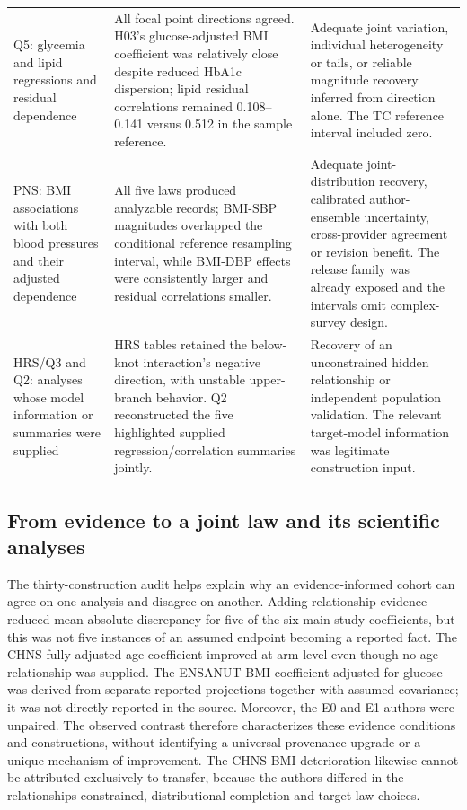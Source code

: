 \documentclass[11pt,letterpaper]{article}
\begin{document}
\begin{xltabular}{\linewidth}{@{}>{\raggedright\arraybackslash}X>{\raggedright\arraybackslash}X>{\raggedright\arraybackslash}X@{}}
Q5: glycemia and lipid regressions and residual dependence & All focal point directions agreed. H03's glucose-adjusted BMI coefficient was relatively close despite reduced HbA1c dispersion; lipid residual correlations remained 0.108–\allowbreak{}0.141 versus 0.512 in the sample reference. & Adequate joint variation, individual heterogeneity or tails, or reliable magnitude recovery inferred from direction alone. The TC reference interval included zero. \\

PNS: BMI associations with both blood pressures and their adjusted dependence & All five laws produced analyzable records; BMI-SBP magnitudes overlapped the conditional reference resampling interval, while BMI-DBP effects were consistently larger and residual correlations smaller. & Adequate joint-distribution recovery, calibrated author-ensemble uncertainty, cross-provider agreement or revision benefit. The release family was already exposed and the intervals omit complex-survey design. \\

HRS/\allowbreak{}Q3 and Q2: analyses whose model information or summaries were supplied & HRS tables retained the below-knot interaction's negative direction, with unstable upper-branch behavior. Q2 reconstructed the five highlighted supplied regression/\allowbreak{}correlation summaries jointly. & Recovery of an unconstrained hidden relationship or independent population validation. The relevant target-model information was legitimate construction input. \\

\end{xltabular}

\endgroup

\subsection{From evidence to a joint law and its scientific analyses}

The thirty-construction audit helps explain why an evidence-informed cohort can agree on one analysis and disagree on another. Adding relationship evidence reduced mean absolute discrepancy for five of the six main-study coefficients, but this was not five instances of an assumed endpoint becoming a reported fact. The CHNS fully adjusted age coefficient improved at arm level even though no age relationship was supplied. The ENSANUT BMI coefficient adjusted for glucose was derived from separate reported projections together with assumed covariance; it was not directly reported in the source. Moreover, the E0 and E1 authors were unpaired. The observed contrast therefore characterizes these evidence conditions and constructions, without identifying a universal provenance upgrade or a unique mechanism of improvement. The CHNS BMI deterioration likewise cannot be attributed exclusively to transfer, because the authors differed in the relationships constrained, distributional completion and target-law choices.
\end{document}

